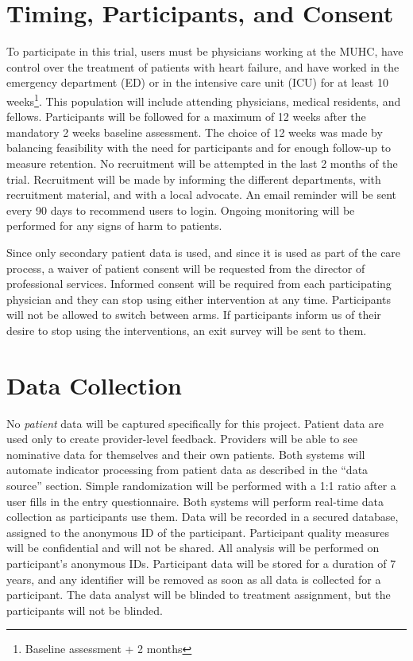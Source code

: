\section{Timing, Participants, and Consent}
To participate in this trial, users must be physicians working at the MUHC, have control over the treatment of patients with heart failure, and have worked in the emergency department (ED) or in the intensive care unit (ICU) for at least 10 weeks\footnote{Baseline assessment + 2 months}. This population will include attending physicians, medical residents, and fellows. Participants will be followed for a maximum of 12 weeks after the mandatory 2 weeks baseline assessment. The choice of 12 weeks was made by balancing feasibility with the need for participants and for enough follow-up to measure retention. No recruitment will be attempted in the last 2 months of the trial. Recruitment will be made by informing the different departments, with recruitment material, and with a local advocate. An email reminder will be sent every 90 days to recommend users to login. Ongoing monitoring will be performed for any signs of harm to patients.

Since only secondary patient data is used, and since it is used as part of the care process, a waiver of patient consent will be requested from the director of professional services. Informed consent will be required from each participating physician and they can stop using either intervention at any time. Participants will not be allowed to switch between arms. If participants inform us of their desire to stop using the interventions, an exit survey will be sent to them.

\section{Data Collection}
No \textit{patient} data will be captured specifically for this project. Patient data are used only to create provider-level feedback. Providers will be able to see nominative data for themselves and their own patients. Both systems will automate indicator processing from patient data as described in the ``data source'' section. Simple randomization will be performed with a 1:1 ratio after a user fills in the entry questionnaire. Both systems will perform real-time data collection as participants use them. Data will be recorded in a secured database, assigned to the anonymous ID of the participant. Participant quality measures will be confidential and will not be shared. All analysis will be performed on participant's anonymous IDs. Participant data will be stored for a duration of 7 years, and any identifier will be removed as soon as all data is collected for a participant. The data analyst will be blinded to treatment assignment, but the participants will not be blinded.

